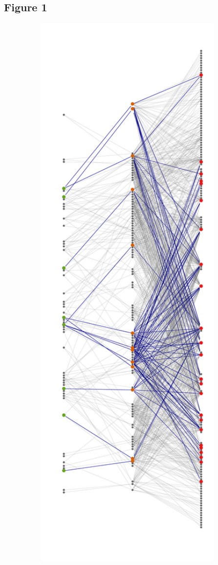 \documentclass[12pt]{article}
\begin{document}
\newpage

\subsection*{Figure 1}

\begin{figure}[ht!]
\centering\includegraphics[width=1\textwidth]{figures/mw_sampling}
\end{figure}
\end{document}
